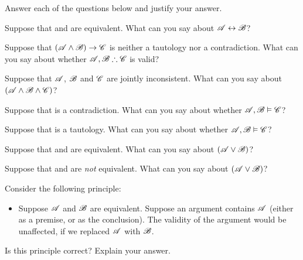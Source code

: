 \problempart
\label{pr.TT.concepts}
Answer each of the questions below and justify your answer.
\begin{earg}
\item Suppose that  and  are equivalent. What can you say about $\mathscr{A}\leftrightarrow\mathscr{B}$?
\item Suppose that $(\mathscr{A}\wedge\mathscr{B})\rightarrow\mathscr{C}$ is neither a tautology nor a contradiction. What can you say about whether $\mathscr{A}, \mathscr{B} \mathrel{\therefore}\mathscr{C}$ is valid?
\item Suppose that $\mathscr{A}$, $\mathscr{B}$ and $\mathscr{C}$  are jointly inconsistent. What can you say about $(\mathscr{A}\wedge\mathscr{B}\wedge\mathscr{C})$?
\item Suppose that  is a contradiction. What can you say about whether $\mathscr{A}, \mathscr{B} \vDash \mathscr{C}$?
\item Suppose that  is a tautology. What can you say about whether $\mathscr{A}, \mathscr{B}\vDash \mathscr{C}$?
\item Suppose that  and  are equivalent. What can you say about $(\mathscr{A}\vee\mathscr{B})$?
\item Suppose that  and  are \emph{not} equivalent. What can you say about $(\mathscr{A}\vee\mathscr{B})$?
\end{earg}
\problempart 
Consider the following principle:
	\begin{itemize}
		\item Suppose $\mathscr{A}$ and $\mathscr{B}$ are equivalent. Suppose an argument contains $\mathscr{A}$ (either as a premise, or as the conclusion). The validity of the argument would be unaffected, if we replaced $\mathscr{A}$ with $\mathscr{B}$.
	\end{itemize}
Is this principle correct? Explain your answer.



